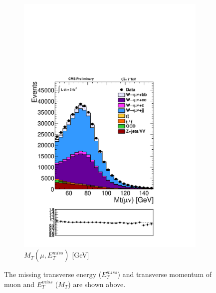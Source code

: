 \begin{figure}[hb]
\begin{subfigure}[b]{.45\textwidth}
	\includegraphics[trim = 0mm 52mm 0mm 0mm, clip,width=\textwidth]{images/MtCal.pdf}
	\caption[]{$M_{T}(\mu,E_{T}^{miss})$ [GeV]}
    \end{subfigure}	
  \caption[]
   	{The missing transverse energy ($E_{T}^{miss}$) and transverse momentum of muon and $E_{T}^{miss}$ ($M_{T}$) are shown above.}
    \label{fig:metVariables}
\end{figure}

